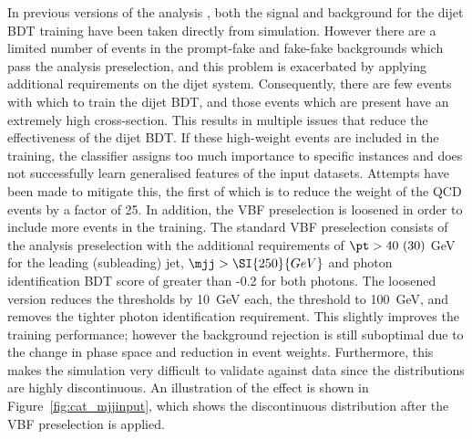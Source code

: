 In previous versions of the analysis \cite{HIG-16-040}, 
both the signal and background for the dijet BDT training have been taken directly from simulation. 
However there are a limited number of events in the prompt-fake and fake-fake backgrounds
which pass the analysis preselection, 
and this problem is exacerbated by applying additional requirements on the dijet system.
Consequently, there are few events with which to train the dijet BDT, 
and those events which are present have an extremely high cross-section.
This results in multiple issues that reduce the effectiveness of the dijet BDT.
If these high-weight events are included in the training, 
the classifier assigns too much importance to specific instances 
and does not successfully learn generalised features of the input datasets.
Attempts have been made to mitigate this, 
the first of which is to reduce the weight of the QCD events by a factor of 25.
In addition, the VBF preselection is loosened in 
order to include more events in the training.
The standard VBF preselection consists of the analysis preselection 
with the additional requirements of $\pt > 40~(30)$ GeV for the leading (subleading) jet, 
$\mjj > \SI{250}{GeV}$ and photon identification BDT score of greater than -0.2 for both photons.
The loosened version reduces the \pt thresholds by \SI{10}{GeV} each, 
the \mjj threshold to \SI{100}{GeV}, and removes the tighter photon identification requirement.
This slightly improves the training performance; 
however the background rejection is still suboptimal 
due to the change in phase space and reduction in event weights.
Furthermore, this makes the simulation very difficult to validate against data
since the distributions are highly discontinuous.
An illustration of the effect is shown in Figure~\ref{fig:cat_mjjinput}, 
which shows the discontinuous \mjj distribution after the VBF preselection is applied.

